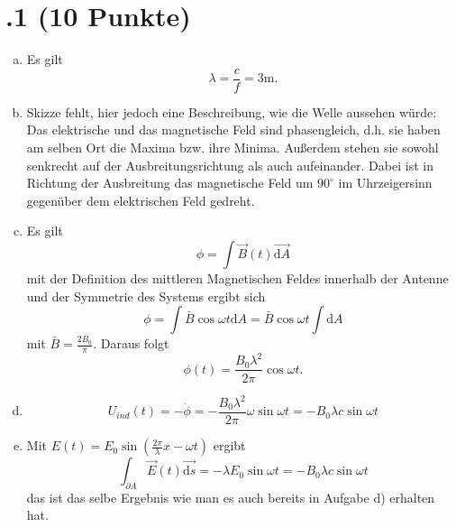 \section*{\nr.1 \titone (10 Punkte)}
\begin{enumerate}[(a)]
\item
Es gilt 
\begin{equation}
  \lambda = \frac{c}{f} = 3\mathrm{m}.
\end{equation}
\item 
Skizze fehlt, hier jedoch eine Beschreibung, wie die Welle aussehen würde:
Das elektrische und das magnetische Feld sind phasengleich, d.h. sie haben am selben Ort die Maxima bzw. ihre Minima. Außerdem stehen sie sowohl senkrecht auf der Ausbreitungsrichtung als auch aufeinander. Dabei ist in Richtung der Ausbreitung das magnetische Feld um $90^\circ$ im Uhrzeigersinn gegenüber dem elektrischen Feld gedreht.

\item Es gilt
\begin{equation}
  \phi=\int\vec B(t) \vec{\mathrm{d}A}
\end{equation}
mit der Definition des mittleren Magnetischen Feldes innerhalb der Antenne und der Symmetrie des Systems ergibt sich
\begin{equation}
  \phi = \int \bar B \cos \omega t \mathrm{d}A=\bar B \cos \omega t \int \mathrm{d}A
\end{equation}
mit $\bar B = \frac{2B_0}{\pi}$.
Daraus folgt
\begin{equation}
  \phi(t)=\frac{B_0\lambda^2}{2\pi}\cos \omega t.
\end{equation}
\item
\begin{equation}
  U_{ind}(t)=-\dot{\phi}=-\frac{B_0\lambda^2}{2\pi}\omega \sin \omega t= -B_0\lambda c \sin \omega t 
\end{equation}
\item 
Mit $E(t)=E_0\sin( \frac{2\pi}{\lambda}x-\omega t)$ ergibt
\begin{equation}
  \int_{\partial A}\vec E(t) \vec{\mathrm{d}s}=-\lambda E_0\sin \omega t = -B_0\lambda c\sin \omega t
\end{equation}
das ist das selbe Ergebnis wie man es auch bereits in Aufgabe d) erhalten hat.


\end{enumerate}